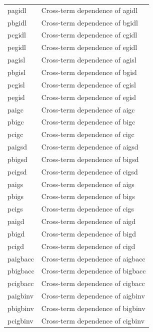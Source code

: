 \begin{longtable}{l l}
{\small pagidl} & {\small Cross-term dependence of agidl} \\
{\small pbgidl} & {\small Cross-term dependence of bgidl} \\
{\small pcgidl} & {\small Cross-term dependence of cgidl} \\
{\small pegidl} & {\small Cross-term dependence of egidl} \\
{\small pagisl} & {\small Cross-term dependence of agisl} \\
{\small pbgisl} & {\small Cross-term dependence of bgisl} \\
{\small pcgisl} & {\small Cross-term dependence of cgisl} \\
{\small pegisl} & {\small Cross-term dependence of egisl} \\
{\small paigc} & {\small Cross-term dependence of aigc} \\
{\small pbigc} & {\small Cross-term dependence of bigc} \\
{\small pcigc} & {\small Cross-term dependence of cigc} \\
{\small paigsd} & {\small Cross-term dependence of aigsd} \\
{\small pbigsd} & {\small Cross-term dependence of bigsd} \\
{\small pcigsd} & {\small Cross-term dependence of cigsd} \\
{\small paigs} & {\small Cross-term dependence of aigs} \\
{\small pbigs} & {\small Cross-term dependence of bigs} \\
{\small pcigs} & {\small Cross-term dependence of cigs} \\
{\small paigd} & {\small Cross-term dependence of aigd} \\
{\small pbigd} & {\small Cross-term dependence of bigd} \\
{\small pcigd} & {\small Cross-term dependence of cigd} \\
{\small paigbacc} & {\small Cross-term dependence of aigbacc} \\
{\small pbigbacc} & {\small Cross-term dependence of bigbacc} \\
{\small pcigbacc} & {\small Cross-term dependence of cigbacc} \\
{\small paigbinv} & {\small Cross-term dependence of aigbinv} \\
{\small pbigbinv} & {\small Cross-term dependence of bigbinv} \\
{\small pcigbinv} & {\small Cross-term dependence of cigbinv} \\

\end{longtable}
